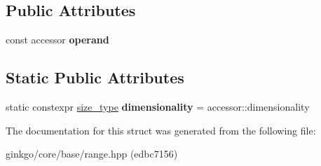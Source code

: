 \subsection*{Public Attributes}
\begin{DoxyCompactItemize}
\item 
\mbox{\label{structgko_1_1accessor_1_1transpose__operation_a2b4c2d5172d31e787f8d4965251743b3}} 
const accessor {\bfseries operand}
\end{DoxyCompactItemize}
\subsection*{Static Public Attributes}
\begin{DoxyCompactItemize}
\item 
\mbox{\label{structgko_1_1accessor_1_1transpose__operation_aee04484bec2b33a04e2482077a5925a5}} 
static constexpr \hyperlink{namespacegko_a6e5c95df0ae4e47aab2f604a22d98ee7}{size\+\_\+type} {\bfseries dimensionality} = accessor\+::dimensionality
\end{DoxyCompactItemize}


The documentation for this struct was generated from the following file\+:\begin{DoxyCompactItemize}
\item 
ginkgo/core/base/range.\+hpp (edbc7156)\end{DoxyCompactItemize}
